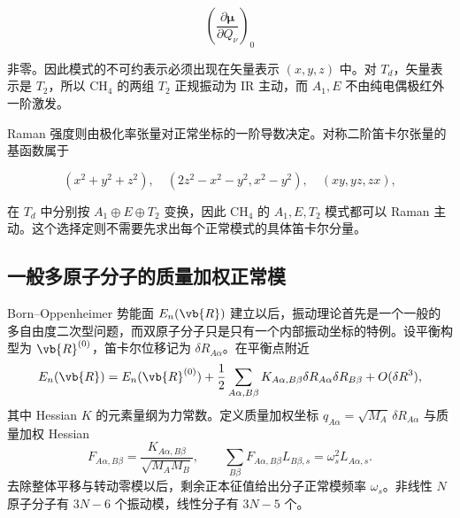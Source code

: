 \[
\left(\frac{\partial\boldsymbol\mu}{\partial Q_\nu}\right)_0
\]

非零。因此模式的不可约表示必须出现在矢量表示 \((x,y,z)\) 中。对 \(T_d\)，矢量表示是 \(T_2\)，所以 CH\(_4\) 的两组 \(T_2\) 正规振动为 IR 主动，而 \(A_1,E\) 不由纯电偶极红外一阶激发。

Raman 强度则由极化率张量对正常坐标的一阶导数决定。对称二阶笛卡尔张量的基函数属于

\[
(x^2+y^2+z^2),
\quad
(2z^2-x^2-y^2,x^2-y^2),
\quad
(xy,yz,zx),
\]

在 \(T_d\) 中分别按 \(A_1\oplus E\oplus T_2\) 变换，因此 CH\(_4\) 的 \(A_1,E,T_2\) 模式都可以 Raman 主动。这个选择定则不需要先求出每个正常模式的具体笛卡尔分量。


\subsection{一般多原子分子的质量加权正常模}

Born--Oppenheimer 势能面 $E_n(\vb{R})$ 建立以后，振动理论首先是一个一般的多自由度二次型问题，而双原子分子只是只有一个内部振动坐标的特例。设平衡构型为 $\vb{R}^{(0)}$，笛卡尔位移记为 $\delta R_{A\alpha}$。在平衡点附近
\[
E_n(\vb{R})=E_n(\vb{R}^{(0)})
+\frac12\sum_{A\alpha,B\beta}
K_{A\alpha,B\beta}\delta R_{A\alpha}\delta R_{B\beta}+O(\delta R^3),
\]
其中 Hessian $K$ 的元素量纲为力常数。定义质量加权坐标 $q_{A\alpha}=\sqrt{M_A}\,\delta R_{A\alpha}$ 与质量加权 Hessian
\begin{equation}
F_{A\alpha,B\beta}
=\frac{K_{A\alpha,B\beta}}{\sqrt{M_AM_B}},
\qquad
\sum_{B\beta}F_{A\alpha,B\beta}L_{B\beta,s}=\omega_s^2L_{A\alpha,s}.
\label{eq:mass-weighted-hessian}
\end{equation}
去除整体平移与转动零模以后，剩余正本征值给出分子正常模频率 $\omega_s$。非线性 $N$ 原子分子有 $3N-6$ 个振动模，线性分子有 $3N-5$ 个。

